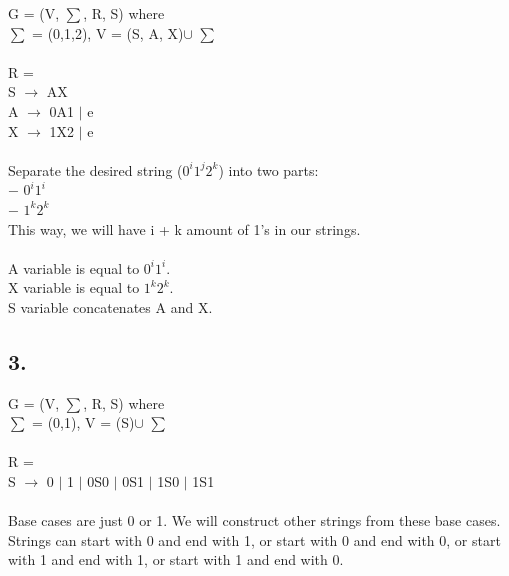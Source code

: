 \documentclass[12pt]{article}
\begin{document}
G = (V, $\sum$, R, S) where \\
$\sum$ = (0,1,2), V = (S, A, X)$\cup$ $\sum$\\
\\
R =\\ 
S $\rightarrow$ AX \\
A $\rightarrow$ 0A1 $|$ e \\
X $\rightarrow$ 1X2 $|$ e \\
\\
Separate the desired string ($0^i 1^j 2^k$) into two parts:\\
$-$ $0^i 1^i$\\
$-$ $1^k 2^k$\\
This way, we will have i + k amount of 1's in our strings.\\
\\
A variable is equal to $0^i 1^i$.\\
X variable is equal to $1^k 2^k$.\\
S variable concatenates A and X.\\

\subsection*{3.} 

G = (V, $\sum$, R, S) where \\
$\sum$ = (0,1), V = (S)$\cup$ $\sum$\\
\\
R =\\ 
S $\rightarrow$ 0 $|$ 1 $|$ 0S0 $|$ 0S1 $|$ 1S0 $|$ 1S1 \\
\\
Base cases are  just 0 or 1. We will construct other strings from these base cases.\\
Strings can start with 0 and end with 1, or start with 0 and end with 0, or start with 1 and end with 1, or start with 1 and end with 0.\\
\end{document}
